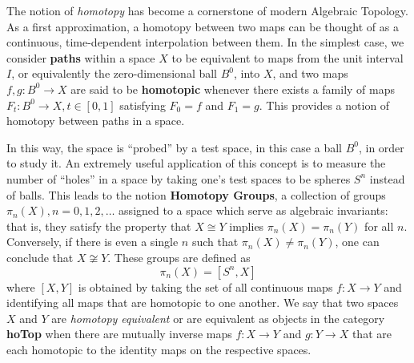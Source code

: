 \documentclass[a0,final]{a0poster}
\begin{document}
\begin{multicols}{3}
The notion of \textit{homotopy} has become a cornerstone of modern Algebraic Topology. As a first approximation, a homotopy between two maps can be thought of as a continuous, time-dependent interpolation between them. In the simplest case, we consider \textbf{paths} within a space $X$ to be equivalent to maps from the unit interval $I$, or equivalently the zero-dimensional ball $B^0$, into $X$, and two maps $f, g: B^0 \to X$ are said to be \textbf{homotopic} whenever there exists a family of maps $F_t: B^0 \to X, t \in [0, 1]$ satisfying $F_0 = f$ and $F_1 = g$. This provides a notion of homotopy between paths in a space.

In this way, the space is ``probed'' by a test space, in this case a ball $B^0$, in order to study it. An extremely useful application of this concept is to measure the number of ``holes'' in a space by taking one's test spaces to be spheres $S^n$ instead of balls. This leads to the notion \textbf{Homotopy Groups}, a collection of groups $\pi_n(X), n = 0, 1, 2, \ldots$ assigned to a space which serve as algebraic invariants: that is, they satisfy the property that $X \cong Y$ implies $\pi_n(X) = \pi_n(Y)$ for all $n$. Conversely, if there is even a single $n$ such that $\pi_n(X) \neq \pi_n(Y)$, one can conclude that $X \not \cong Y$. These groups are defined as
$$\pi_n(X) = [S^n, X]$$
where $[X, Y]$ is obtained by taking the set of all continuous maps $f: X \to Y$ and identifying all maps that are homotopic to one another. We say that two spaces $X$ and $Y$ are \textit{homotopy equivalent} or are equivalent as objects in the category \textbf{hoTop} when there are mutually inverse maps $f: X \to Y$ and $g: Y \to X$ that are each homotopic to the identity maps on the respective spaces.

\begin{center}



\end{center}
\end{multicols}
\end{document}
